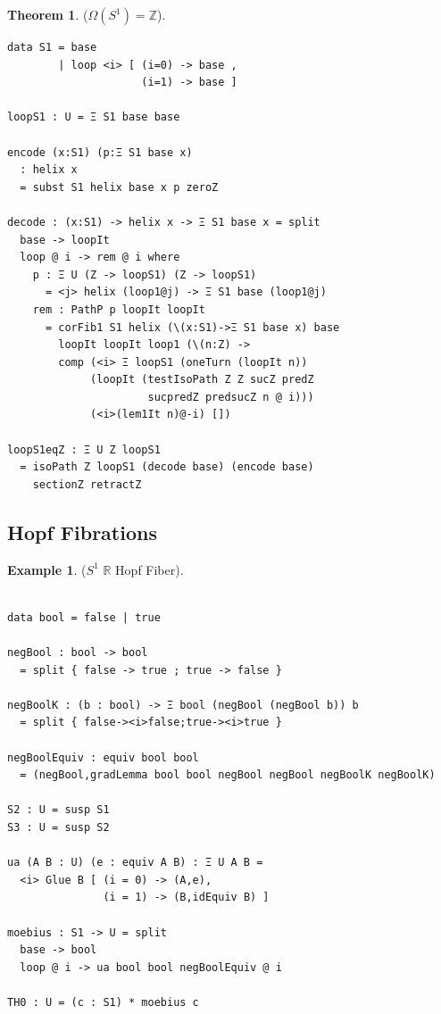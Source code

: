\documentclass{article}
\theoremstyle{definition}
\newtheorem{theorem}{Theorem}
\newtheorem{example}{Example}
\begin{document}
\begin{theorem} ($\Omega(S^1)=\mathbb{Z}$).
\begin{lstlisting}
data S1 = base
        | loop <i> [ (i=0) -> base ,
                     (i=1) -> base ]

loopS1 : U = Ξ S1 base base

encode (x:S1) (p:Ξ S1 base x)
  : helix x
  = subst S1 helix base x p zeroZ

decode : (x:S1) -> helix x -> Ξ S1 base x = split
  base -> loopIt
  loop @ i -> rem @ i where
    p : Ξ U (Z -> loopS1) (Z -> loopS1)
      = <j> helix (loop1@j) -> Ξ S1 base (loop1@j)
    rem : PathP p loopIt loopIt
      = corFib1 S1 helix (\(x:S1)->Ξ S1 base x) base
        loopIt loopIt loop1 (\(n:Z) ->
        comp (<i> Ξ loopS1 (oneTurn (loopIt n))
             (loopIt (testIsoPath Z Z sucZ predZ
                      sucpredZ predsucZ n @ i)))
             (<i>(lem1It n)@-i) [])

loopS1eqZ : Ξ U Z loopS1
  = isoPath Z loopS1 (decode base) (encode base)
    sectionZ retractZ
\end{lstlisting}
\end{theorem}

\newpage
\subsection{Hopf Fibrations}

\begin{example} ($S^1$ $\mathbb{R}$ Hopf Fiber).
\begin{lstlisting}

data bool = false | true

negBool : bool -> bool
  = split { false -> true ; true -> false }

negBoolK : (b : bool) -> Ξ bool (negBool (negBool b)) b
  = split { false-><i>false;true-><i>true }

negBoolEquiv : equiv bool bool
  = (negBool,gradLemma bool bool negBool negBool negBoolK negBoolK)

S2 : U = susp S1
S3 : U = susp S2

ua (A B : U) (e : equiv A B) : Ξ U A B =
  <i> Glue B [ (i = 0) -> (A,e),
               (i = 1) -> (B,idEquiv B) ]

moebius : S1 -> U = split
  base -> bool
  loop @ i -> ua bool bool negBoolEquiv @ i

TH0 : U = (c : S1) * moebius c
\end{lstlisting}
\end{example}
\end{document}

